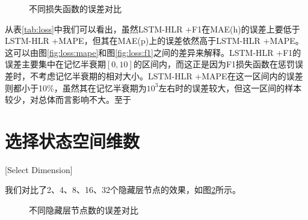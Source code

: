 \begin{figure}[htbp]
    \centering
    \begin{minipage}{\textwidth}
    \centering
    \subfigure{\label{fig:loss:mape}}\addtocounter{subfigure}{-2}
    \hspace{2em}
    \subfigure{\label{fig:loss:f1}}\addtocounter{subfigure}{-2}
    \hspace{2em}    \end{minipage}    
    \vspace{0.2em}
    \caption{不同损失函数的误差对比}
    \label{fig:loss}
\end{figure}

从表\ref{tab:loss}中我们可以看出，虽然LSTM-HLR +F1在MAE(h)的误差上要低于LSTM-HLR +MAPE，但其在MAE(p)上的误差依然高于LSTM-HLR +MAPE。这可以由图\ref{fig:loss:mape}和图\ref{fig:loss:f1}之间的差异来解释。LSTM-HLR +F1的误差主要集中在记忆半衰期$[0,10]$的区间内，而这正是因为F1损失函数在惩罚误差时，不考虑记忆半衰期的相对大小。LSTM-HLR +MAPE在这一区间内的误差则都小于10\%，虽然其在记忆半衰期为$10^3$左右时的误差较大，但这一区间的样本较少，对总体而言影响不大。至于

\section{选择状态空间维数}[Select Dimension]

我们对比了2、4、8、16、32个隐藏层节点的效果，如图\ref{fig:dimension}所示。

\begin{figure}[htbp]
    \centering
    \begin{minipage}{\textwidth}
    \centering
    \subfigure{\label{fig:dimension:train}}\addtocounter{subfigure}{-2}
    \hspace{2em}
    \subfigure{\label{fig:dimension:test}}\addtocounter{subfigure}{-2}
    \end{minipage}
    \centering
    \begin{minipage}{\textwidth}
    \centering
    \subfigure{\label{fig:dimension:smooth}}\addtocounter{subfigure}{-2}
    \hspace{2em}
    \subfigure{\label{fig:dimension:trand}}\addtocounter{subfigure}{-2}
    \end{minipage}
    \vspace{0.2em}
    \caption{不同隐藏层节点数的误差对比}
    \label{fig:dimension}
\end{figure}

